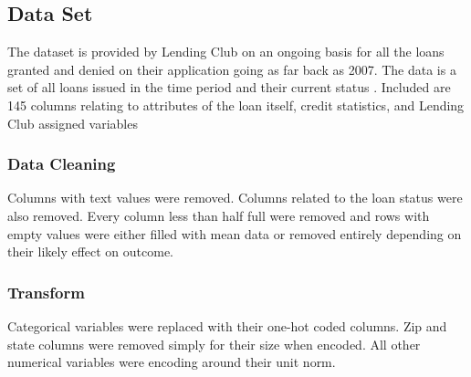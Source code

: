 \subsection{Data Set}

The dataset is provided by Lending Club on an ongoing basis for all the loans granted and denied on their application going as far back as 2007. The data is a set of all loans issued in the time period and their current status \cite{lendingclub}. Included are 145 columns relating to attributes of the loan itself, credit statistics, and Lending Club assigned variables  

\subsubsection{Data Cleaning}

Columns with text values were removed. Columns related to the loan status were also removed.  Every column less than half full were removed and rows with empty values were either filled with mean data or removed entirely depending on their likely effect on outcome.  

\subsubsection{Transform}

Categorical variables were replaced with their one-hot coded columns.  Zip and state columns were removed simply for their size when encoded. All other numerical variables were encoding around their unit norm. 